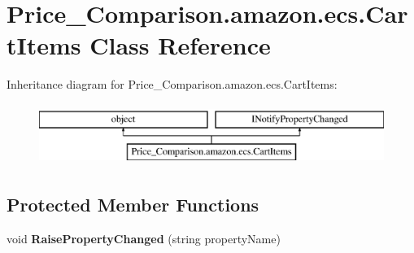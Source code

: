 \hypertarget{class_price___comparison_1_1amazon_1_1ecs_1_1_cart_items}{\section{Price\-\_\-\-Comparison.\-amazon.\-ecs.\-Cart\-Items Class Reference}
\label{class_price___comparison_1_1amazon_1_1ecs_1_1_cart_items}
}


 


Inheritance diagram for Price\-\_\-\-Comparison.\-amazon.\-ecs.\-Cart\-Items\-:\begin{figure}[H]
\begin{center}
\leavevmode
\includegraphics[height=2.000000cm]{class_price___comparison_1_1amazon_1_1ecs_1_1_cart_items}
\end{center}
\end{figure}
\subsection*{Protected Member Functions}
\begin{DoxyCompactItemize}
\item 
\hypertarget{class_price___comparison_1_1amazon_1_1ecs_1_1_cart_items_a405440a585e36d4ded321eda67374966}{void {\bfseries Raise\-Property\-Changed} (string property\-Name)}\label{class_price___comparison_1_1amazon_1_1ecs_1_1_cart_items_a405440a585e36d4ded321eda67374966}

\end{DoxyCompactItemize}
